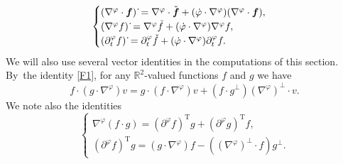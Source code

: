 \documentclass[11pt]{article}
\newcommand{\R}{{\mathbb R}}
\newcommand{\dt}{\partial_t}
\theoremstyle{definition}
\begin{document}
\begin{equation}\label{linearization 2}
\begin{cases}
(\nabla^\varphi \cdot \mbox{\boldmath$f$})\,\dot{}
= \nabla^\varphi \cdot \check{\mbox{\boldmath$f$}}
+ (\dot{\varphi} \cdot \nabla^\varphi)(\nabla^\varphi \cdot \mbox{\boldmath$f$}), \\
(\nabla^\varphi f)\,\dot{}
= \nabla^\varphi \check{f} + (\dot{\varphi} \cdot \nabla^\varphi)\nabla^\varphi f, \\
(\dt^\varphi f)\,\dot{}
= \dt^\varphi\check{f} + (\dot{\varphi} \cdot \nabla^\varphi)\dt^\varphi f.
\end{cases}
\end{equation}
We will also use several vector identities in the computations of this section. By~the identity \eqref{F1}, for any $\R^2$-valued functions $f$ and $g$ we have
\begin{equation}\label{F2}
f\cdot(g\cdot\nabla^\varphi)v = g\cdot(f\cdot\nabla^\varphi)v+(f\cdot g^\perp)(\nabla^\varphi)^\perp\cdot v.
\end{equation}
We note also the identities
\begin{equation}\label{F3}
\begin{cases}
\nabla^\varphi(f\cdot g) = (\partial^\varphi f)^\mathrm{T}g + (\partial^\varphi g)^\mathrm{T}f, \\
(\partial^\varphi f)^\mathrm{T}g = (g\cdot\nabla^\varphi)f - ((\nabla^\varphi)^\perp\cdot f)g^\perp.
\end{cases}
\end{equation}
\end{document}
